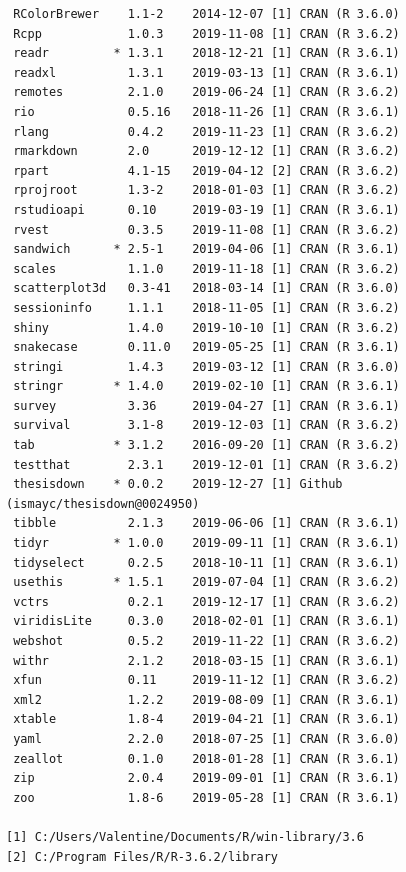 \documentclass[12pt,twoside]{reedthesis}
\begin{document}
\begin{verbatim}
 RColorBrewer    1.1-2    2014-12-07 [1] CRAN (R 3.6.0)                    
 Rcpp            1.0.3    2019-11-08 [1] CRAN (R 3.6.2)                    
 readr         * 1.3.1    2018-12-21 [1] CRAN (R 3.6.1)                    
 readxl          1.3.1    2019-03-13 [1] CRAN (R 3.6.1)                    
 remotes         2.1.0    2019-06-24 [1] CRAN (R 3.6.2)                    
 rio             0.5.16   2018-11-26 [1] CRAN (R 3.6.1)                    
 rlang           0.4.2    2019-11-23 [1] CRAN (R 3.6.2)                    
 rmarkdown       2.0      2019-12-12 [1] CRAN (R 3.6.2)                    
 rpart           4.1-15   2019-04-12 [2] CRAN (R 3.6.2)                    
 rprojroot       1.3-2    2018-01-03 [1] CRAN (R 3.6.2)                    
 rstudioapi      0.10     2019-03-19 [1] CRAN (R 3.6.1)                    
 rvest           0.3.5    2019-11-08 [1] CRAN (R 3.6.2)                    
 sandwich      * 2.5-1    2019-04-06 [1] CRAN (R 3.6.1)                    
 scales          1.1.0    2019-11-18 [1] CRAN (R 3.6.2)                    
 scatterplot3d   0.3-41   2018-03-14 [1] CRAN (R 3.6.0)                    
 sessioninfo     1.1.1    2018-11-05 [1] CRAN (R 3.6.2)                    
 shiny           1.4.0    2019-10-10 [1] CRAN (R 3.6.2)                    
 snakecase       0.11.0   2019-05-25 [1] CRAN (R 3.6.1)                    
 stringi         1.4.3    2019-03-12 [1] CRAN (R 3.6.0)                    
 stringr       * 1.4.0    2019-02-10 [1] CRAN (R 3.6.1)                    
 survey          3.36     2019-04-27 [1] CRAN (R 3.6.1)                    
 survival        3.1-8    2019-12-03 [1] CRAN (R 3.6.2)                    
 tab           * 3.1.2    2016-09-20 [1] CRAN (R 3.6.2)                    
 testthat        2.3.1    2019-12-01 [1] CRAN (R 3.6.2)                    
 thesisdown    * 0.0.2    2019-12-27 [1] Github (ismayc/thesisdown@0024950)
 tibble          2.1.3    2019-06-06 [1] CRAN (R 3.6.1)                    
 tidyr         * 1.0.0    2019-09-11 [1] CRAN (R 3.6.1)                    
 tidyselect      0.2.5    2018-10-11 [1] CRAN (R 3.6.1)                    
 usethis       * 1.5.1    2019-07-04 [1] CRAN (R 3.6.2)                    
 vctrs           0.2.1    2019-12-17 [1] CRAN (R 3.6.2)                    
 viridisLite     0.3.0    2018-02-01 [1] CRAN (R 3.6.1)                    
 webshot         0.5.2    2019-11-22 [1] CRAN (R 3.6.2)                    
 withr           2.1.2    2018-03-15 [1] CRAN (R 3.6.1)                    
 xfun            0.11     2019-11-12 [1] CRAN (R 3.6.2)                    
 xml2            1.2.2    2019-08-09 [1] CRAN (R 3.6.1)                    
 xtable          1.8-4    2019-04-21 [1] CRAN (R 3.6.1)                    
 yaml            2.2.0    2018-07-25 [1] CRAN (R 3.6.0)                    
 zeallot         0.1.0    2018-01-28 [1] CRAN (R 3.6.1)                    
 zip             2.0.4    2019-09-01 [1] CRAN (R 3.6.1)                    
 zoo             1.8-6    2019-05-28 [1] CRAN (R 3.6.1)                    

[1] C:/Users/Valentine/Documents/R/win-library/3.6
[2] C:/Program Files/R/R-3.6.2/library
\end{verbatim}

\end{document}
